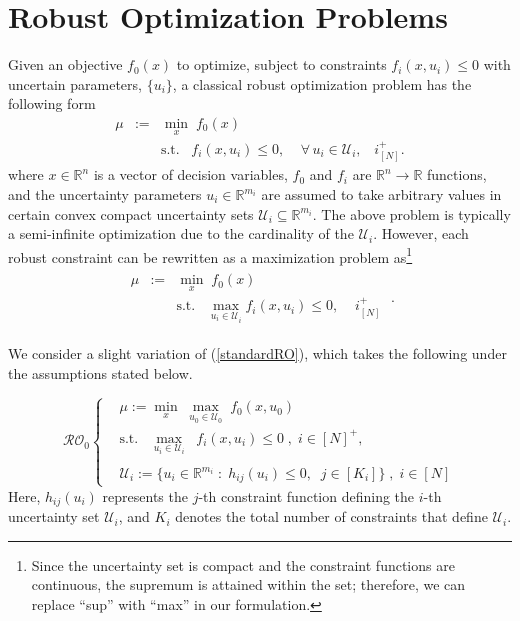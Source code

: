 \documentclass[journal,twoside,web]{ieeecolor}
\newcommand{\rev}[1]{\textcolor{revisionblue}{#1}}
\newcommand{\real}{\mathbb{R}}
\begin{document}
\section{Robust Optimization Problems}\label{sec_RO}
Given an objective $f_0(x)$ to optimize, subject to constraints $f_i(x,u_i) \leq 0$ with uncertain parameters, $\{u_i\}$, a classical robust optimization problem has the following form
$$
\begin{array}{ccc}
\mu&:=&\underset{x}{\min}\; f_0(x)\\
&&\text{s.t.}\;\;\;f_i(x,u_i)\leq 0,\;\;\;\; \forall \,u_i\in \mathcal{U}_i,\;\;\;i^+_{[N]}.
\end{array}
$$
where $x\in \real^n$ is a vector of decision variables, $f_0$ and $f_i$ are $\real^n \to \real$ functions, and the uncertainty parameters $u_i \in \real^{m_i}$ are assumed to take arbitrary values in certain convex compact uncertainty sets $\mathcal{U}_i \subseteq \real^{m_i}$.
The above problem is typically a semi-infinite optimization due to the cardinality of the $\mathcal{U}_i$. However, each robust constraint can be rewritten as a maximization problem as\footnote{\rev{Since the uncertainty set is compact and the constraint functions are continuous, the supremum is attained within the set; therefore, we can replace ``sup'' with ``max'' in our formulation.}}
\begin{align}
\begin{array}{ccc}
\mu&:=&\underset{x}{\min}\; f_0(x)\\
&&\text{s.t.}\;\;\;\displaystyle\max_{{u_i\in \mathcal{U}}_i} f_i(x,u_i)\leq 0,\;\;\;\;i^+_{[N]}
\end{array}\;.\label{standardRO}
\end{align}

We consider a slight variation of (\ref{standardRO}), which takes the following under the assumptions stated below.

\begin{equation}\label{RO0}
\mathcal{RO}_0\left\{ \begin{array}{ccc}
&\mu:=\underset{x}{\min} \;\underset{u_0\in \mathcal{U}_0}{\max}\; f_0(x,u_0)\\
&\text{s.t.}\;\;\;\underset{u_i\in \mathcal{U}_i}{\max}\;\; f_i(x,u_i)\leq 0\;,\;i\in[N]^+,\\ \\
&\mathcal{U}_i:=\{u_ i\in \mathbb{R}^{m_i}\;:\;h_{ij}(u_i)\leq 0,\;\;j\in[K_i]\}\;,\;i\in[N]
\end{array}\right.
\end{equation}
\rev{Here, $h_{ij}(u_i)$ represents the $j$-th constraint function defining the $i$-th uncertainty set $\mathcal{U}_i$, and $K_i$ denotes the total number of constraints that define $\mathcal{U}_i$.} 
\end{document}
